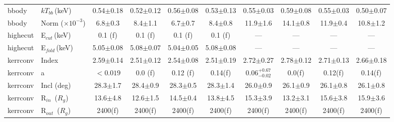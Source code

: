 \documentclass{aa}
\begin{document}
\begin{appendix}
\begin{sidewaystable*}
\begin{tabular}{llcccccccc}
bbody & 
$kT_{bb}\,$(keV) & 
0.54$\pm$0.18 & 
0.52$\pm$0.12 &
0.56$\pm$0.08 &
0.53$\pm$0.13 &
0.55$\pm$0.03 &
0.59$\pm$0.08 &
0.55$\pm$0.03 &
0.50$\pm$0.07 \\

bbody & 
Norm ($\times10^{-3}$) &  
6.8$\pm$0.3 &
8.4$\pm$1.1 &
6.7$\pm$0.7 &
8.4$\pm$0.8 &
11.9$\pm$1.6 &
14.1$\pm$0.8 &
11.9$\pm$0.4 &
10.8$\pm$1.2 \\







\hline

highecut &
E$_{cut}\,$(keV)   & 
0.1 (f) &
0.1 (f) &
0.1 (f) &
0.1 (f) &
---&
---&
---&
--- \\



highecut &
E$_{fold}\,$(keV)   & 
5.05$\pm$0.08 &
5.08$\pm$0.07 &
5.04$\pm$0.05 &
5.08$\pm$0.08 &
---&
---&
---&
--- \\






\hline

kerrconv & 
Index   & 
2.59$\pm$0.14 &
2.51$\pm$0.12&
2.54$\pm$0.08 &
2.51$\pm$0.19 &
2.72$\pm$0.27 &
2.78$\pm$0.12 &
2.71$\pm$0.13&
2.66$\pm$0.18 \\












kerrconv & 
a   & 
$ < 0.019$ &
0.0 (f) &
0.12 (f) &
0.14(f) &
0.06$^{+0.67}_{-0.02}$  &
0.0(f) &
0.12(f) &
0.14(f)\\



kerrconv & 
Incl (deg)   & 
28.3$\pm$1.7 &
28.4$\pm$0.9 &
28.3$\pm$0.5 &
28.3$\pm$1.4 &
26.0$\pm$0.9 &
26.1$\pm$0.9 &
26.1$\pm$0.8&
26.1$\pm$0.8 \\


kerrconv & 
R$_{in}\,$ ($R_g$) &
13.6$\pm$4.8 & 
12.6$\pm$1.5&
14.5$\pm$0.4&
13.8$\pm$4.5&
15.3$\pm$3.9&
13.2$\pm$3.1 &
15.6$\pm$3.8 &
15.9$\pm$3.6\\


kerrconv & 
R$_{out}\,$ ($R_g$)  & 
2400(f) & 
2400(f) &
2400(f) &
2400(f) &
2400(f) &
2400(f) &
2400(f) &
2400(f)\\






\end{tabular}
\end{sidewaystable*}
\end{appendix}
\end{document}
